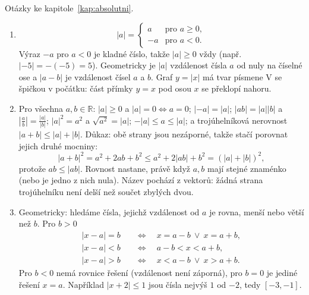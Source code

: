 Otázky ke kapitole~\ref{kap:absolutni}.

\begin{enumerate}[label=\textbf{\arabic*.}, leftmargin=*, itemsep=0.8em]
  \item {}
  \begin{equation*}
    |a| = \begin{cases} a & \text{pro } a\geq 0,\\ -a & \text{pro } a < 0. \end{cases}
  \end{equation*}
  Výraz $-a$ pro $a < 0$ je kladné číslo, takže $|a|\geq 0$ vždy (např. $|-5| = -(-5) = 5$). Geometricky je $|a|$ vzdálenost čísla $a$ od nuly na číselné ose a $|a - b|$ je vzdálenost čísel $a$ a $b$. Graf $y = |x|$ má tvar písmene V se špičkou v počátku: část přímky $y = x$ pod osou $x$ se překlopí nahoru.

  \item {}
  Pro všechna $a, b\in\mathbb{R}$: $|a|\geq 0$ a $|a| = 0\Leftrightarrow a = 0$; $|-a| = |a|$; $|ab| = |a||b|$ a $\left|\frac{a}{b}\right| = \frac{|a|}{|b|}$; $|a|^2 = a^2$ a $\sqrt{a^2} = |a|$; $-|a|\leq a\leq |a|$; a trojúhelníková nerovnost $|a + b|\leq |a| + |b|$. Důkaz: obě strany jsou nezáporné, takže stačí porovnat jejich druhé mocniny:
  \begin{equation*}
    |a + b|^2 = a^2 + 2ab + b^2 \leq a^2 + 2|ab| + b^2 = {(|a| + |b|)}^2,
  \end{equation*}
  protože $ab\leq |ab|$. Rovnost nastane, právě když $a, b$ mají stejné znaménko (nebo je jedno z nich nula). Název pochází z vektorů: žádná strana trojúhelníku není delší než součet zbylých dvou. 

  \item {}
  Geometricky: hledáme čísla, jejichž vzdálenost od $a$ je rovna, menší nebo větší než $b$. Pro $b > 0$
  \begin{align*}
    |x - a| = b &\quad\Leftrightarrow\quad x = a - b\ \lor\ x = a + b,\\
    |x - a| < b &\quad\Leftrightarrow\quad a - b < x < a + b,\\
    |x - a| > b &\quad\Leftrightarrow\quad x < a - b\ \lor\ x > a + b.
  \end{align*}
  Pro $b < 0$ nemá rovnice řešení (vzdálenost není záporná), pro $b = 0$ je jediné řešení $x = a$. Například $|x + 2|\leq 1$ jsou čísla nejvýš $1$ od $-2$, tedy $[-3, -1]$. 


\end{enumerate}
